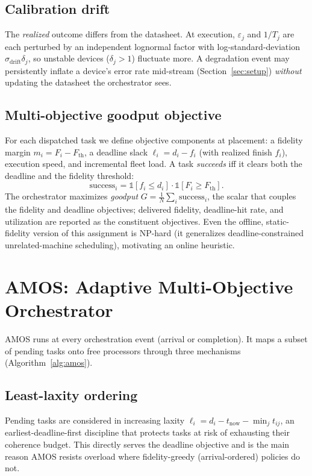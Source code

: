 \documentclass[conference]{IEEEtran}
\begin{document}
\subsection{Calibration drift}
The \emph{realized} outcome differs from the datasheet. At execution,
$\varepsilon_j$ and $1/T_j$ are each perturbed by an independent lognormal factor
with log-standard-deviation $\sigma_{\text{drift}}\delta_j$, so unstable devices
($\delta_j\!>\!1$) fluctuate more. A degradation event may persistently inflate a
device's error rate mid-stream (Section~\ref{sec:setup}) \emph{without} updating
the datasheet the orchestrator sees.

\subsection{Multi-objective goodput objective}
For each dispatched task we define objective components at placement: a fidelity
margin $m_i=F_i-F_{\text{th}}$, a deadline slack $\ell_i=d_i-f_i$ (with realized
finish $f_i$), execution speed, and incremental fleet load. A task \emph{succeeds}
iff it clears both the deadline and the fidelity threshold:
\begin{equation}
\text{success}_i = \mathbb{1}\!\left[f_i \le d_i\right]\cdot
\mathbb{1}\!\left[F_i \ge F_{\text{th}}\right].
\end{equation}
The orchestrator maximizes \emph{goodput}
$G=\frac{1}{N}\sum_{i}\text{success}_i$, the scalar that couples the fidelity and
deadline objectives; delivered fidelity, deadline-hit rate, and utilization are
reported as the constituent objectives. Even the offline, static-fidelity version
of this assignment is NP-hard (it generalizes deadline-constrained
unrelated-machine scheduling), motivating an online heuristic.

\section{AMOS: Adaptive Multi-Objective Orchestrator}
\label{sec:method}
AMOS runs at every orchestration event (arrival or completion). It maps a subset
of pending tasks onto free processors through three mechanisms
(Algorithm~\ref{alg:amos}).

\subsection{Least-laxity ordering}
Pending tasks are considered in increasing laxity
$\ell_i=d_i-t_{\text{now}}-\min_j t_{ij}$, an earliest-deadline-first discipline
that protects tasks at risk of exhausting their coherence budget. This directly
serves the deadline objective and is the main reason AMOS resists overload where
fidelity-greedy (arrival-ordered) policies do not.
\end{document}
